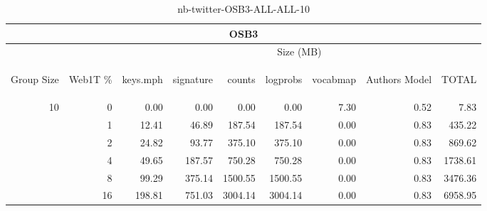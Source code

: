\begin{center}
\begin{table}[htbp] 
 \begin{center}
\begin{tabular}{ | r | r | r | r | r | r | r | r | r |}
\hline
\multicolumn{9}{|c|}{OSB3}\\
\hline
 & & \multicolumn{7}{|c|}{Size (MB)}\\ \cline{3-9}
\begin{sideways}Group Size\end{sideways} & \begin{sideways}Web1T \% \end{sideways} & \begin{sideways}keys.mph\end{sideways} & \begin{sideways}signature\end{sideways} & \begin{sideways}counts\end{sideways} & \begin{sideways}logprobs\end{sideways} & \begin{sideways}vocabmap\end{sideways} & \begin{sideways}Authors Model \end{sideways} & \begin{sideways}TOTAL\end{sideways}\\
\hline
\multirow{5}{*}{10}
 & 0 & 0.00 & 0.00 & 0.00 & 0.00 & 7.30 & 0.52 & 7.83\\ \cline{2-9}
 & 1 & 12.41 & 46.89 & 187.54 & 187.54 & 0.00 & 0.83 & 435.22\\ \cline{2-9}
 & 2 & 24.82 & 93.77 & 375.10 & 375.10 & 0.00 & 0.83 & 869.62\\ \cline{2-9}
 & 4 & 49.65 & 187.57 & 750.28 & 750.28 & 0.00 & 0.83 & 1738.61\\ \cline{2-9}
 & 8 & 99.29 & 375.14 & 1500.55 & 1500.55 & 0.00 & 0.83 & 3476.36\\ \cline{2-9}
 & 16 & 198.81 & 751.03 & 3004.14 & 3004.14 & 0.00 & 0.83 & 6958.95\\ \cline{2-9}
\hline
\end{tabular}
\caption{nb-twitter-OSB3-ALL-ALL-10}
\label{table:nb-twitter-OSB3-ALL-ALL-10}
\end{center}
 \end{table}
\end{center}

